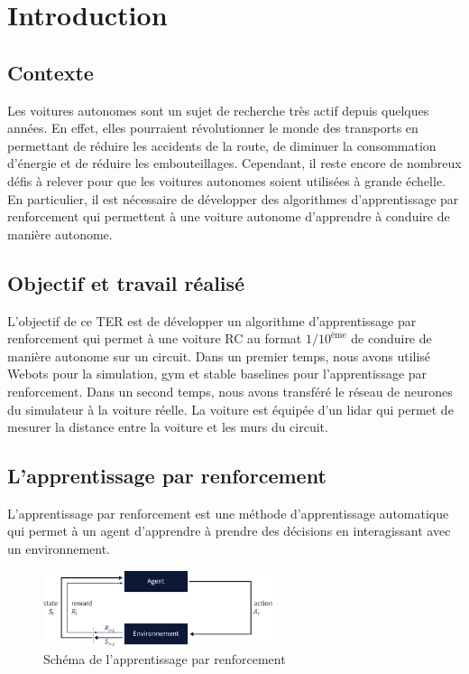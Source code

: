 \documentclass[french]{article}
\begin{document}
\newpage

\tableofcontents

\newpage

\section{Introduction}

\subsection{Contexte}

Les voitures autonomes sont un sujet de recherche très actif depuis quelques années. 
En effet, elles pourraient révolutionner le monde des transports en permettant de réduire les accidents de la route, 
de diminuer la consommation d'énergie et de réduire les embouteillages. 
Cependant, il reste encore de nombreux défis à relever pour que les voitures autonomes soient utilisées à grande échelle.
En particulier, il est nécessaire de développer des algorithmes d'apprentissage par renforcement qui permettent à une 
voiture autonome d'apprendre à conduire de manière autonome.

\subsection{Objectif et travail réalisé}
L'objectif de ce TER est de développer un algorithme d'apprentissage par renforcement qui permet à une 
voiture RC au format $1/10^{\text{ème}}$ de conduire de manière autonome sur un circuit. Dans un premier temps, nous 
avons utilisé Webots pour la simulation, gym et stable baselines pour l'apprentissage par renforcement.
Dans un second temps, nous avons transféré le réseau de neurones du simulateur à la voiture réelle.
La voiture est équipée d'un lidar qui permet de mesurer la distance entre la voiture et les murs du circuit.


\subsection{L'apprentissage par renforcement}
L'apprentissage par renforcement est une méthode d'apprentissage automatique qui permet à un agent 
d'apprendre à prendre des décisions en interagissant avec un environnement. 

\begin{figure}[H]
    \centering
    \includegraphics[width=0.6\textwidth]{Images/RL.png}
    \caption{Schéma de l'apprentissage par renforcement}
\end{figure}
\end{document}
